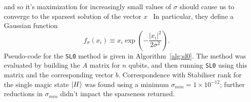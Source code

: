 \documentclass{standalone}
\begin{document}
and so it's maximization for increasingly small values of $\sigma$ should cause us to converge to the sparsest solution of the vector $x$~\cite{Mohimani2009} In particular, they define a Gaussian function~\cite{Mohimani2009}
\begin{equation}\label{eq:fxi}
    f_{\sigma}(x_{i})\equiv x_{i}\exp\left(-\frac{\vert x_{i}\vert^{2}}{2\sigma^{2}} \right).
\end{equation}
Pseudo-code for the \texttt{SL0} method is given in Algorithm~\ref{alg:sl0}. The method was evaluated by building the $A$ matrix for $n$ qubits, and then running \texttt{SL0} using this matrix and the corresponding vector $b$. Correspondence with Stabiliser rank for the single magic state $\ket{H}$ was found using a minimum $\sigma_{min}=1\times 10^{-12}$; further reductions in $\sigma_{min}$ didn't impact the sparseness returned. 
\end{document}
